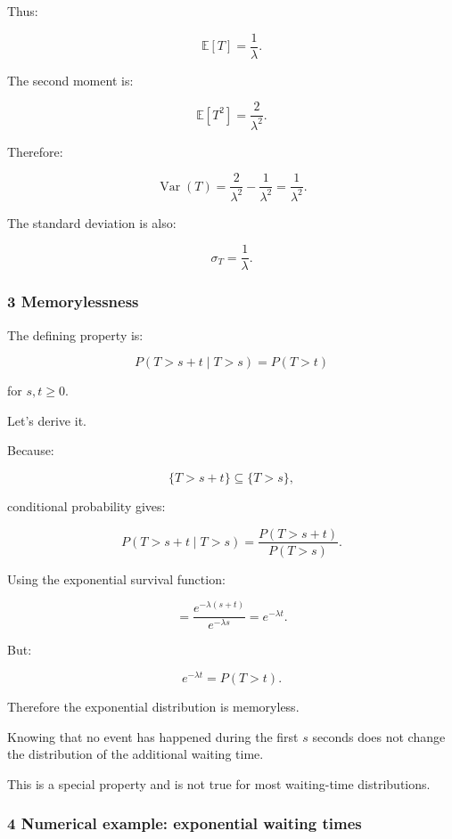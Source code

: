 Thus:

\[
 \boxed{ \mathbb E[T]=\frac1\lambda }.
\]

The second moment is:

\[
 \mathbb E[T^2]=\frac2{\lambda^2}.
\]

Therefore:

\[
 \operatorname{Var}(T) = \frac2{\lambda^2} -\frac1{\lambda^2} = \boxed{\frac1{\lambda^2}}.
\]

The standard deviation is also:

\[
 \sigma_T=\frac1\lambda.
\]

\subsubsection{3 Memorylessness}\label{02-foundations-ii-ch024-memorylessness}

\hypertarget{02-foundations-ii-ch024-memorylessness}{}

The defining property is:

\[
 \boxed{ P(T>s+t\mid T>s)=P(T>t) }
\]

for \(s,t\ge0\).

Let's derive it.

Because:

\[
 \{T>s+t\}\subseteq\{T>s\},
\]

conditional probability gives:

\[
 P(T>s+t\mid T>s) = \frac{P(T>s+t)}{P(T>s)}.
\]

Using the exponential survival function:

\[
 = \frac{e^{-\lambda(s+t)}}{e^{-\lambda s}} =e^{-\lambda t}.
\]

But:

\[
 e^{-\lambda t}=P(T>t).
\]

Therefore the exponential distribution is memoryless.

Knowing that no event has happened during the first \(s\) seconds does not change the distribution of the additional waiting time.

This is a special property and is not true for most waiting-time distributions.

\subsubsection{4 Numerical example: exponential waiting times}\label{02-foundations-ii-ch024-numerical-example-exponential-waiting-times}

\hypertarget{02-foundations-ii-ch024-numerical-example-exponential-waiting-times}{}

